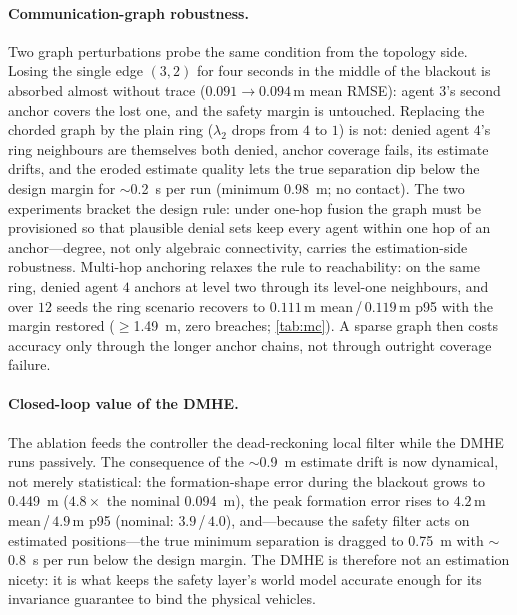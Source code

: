 \paragraph{Communication-graph robustness.}
\label{sec:sim-mc-graph}
Two graph perturbations probe the same condition from the topology side. Losing
the single edge $(3,2)$ for four seconds in the middle of the blackout is
absorbed almost without trace ($0.091\to0.094$\,m mean RMSE): agent $3$'s second
anchor covers the lost one, and the safety margin is untouched. Replacing the
chorded graph by the plain ring ($\lambda_2$ drops from $4$ to $1$) is not:
denied agent $4$'s ring neighbours are themselves both denied, anchor coverage
fails, its estimate drifts, and the eroded estimate quality lets the true
separation dip below the design margin for $\sim$\SI{0.2}{\second} per run
(minimum \SI{0.98}{\meter}; no contact). The two experiments bracket the design
rule: under one-hop fusion the graph must be provisioned so that plausible
denial sets keep every agent within one hop of an anchor---degree, not only
algebraic connectivity, carries the estimation-side robustness. Multi-hop
anchoring relaxes the rule to reachability: on the same ring, denied agent $4$
anchors at level two through its level-one neighbours, and over $12$ seeds the
ring scenario recovers to $0.111$\,m mean\,/\,$0.119$\,m p95 with the margin
restored ($\ge$\SI{1.49}{\meter}, zero breaches; \cref{tab:mc}). A sparse graph
then costs accuracy only through the longer anchor chains, not through outright
coverage failure.

\paragraph{Closed-loop value of the DMHE.} The ablation feeds the controller the
dead-reckoning local filter while the DMHE runs passively. The consequence of
the $\sim$\SI{0.9}{\meter} estimate drift is now dynamical, not merely
statistical: the formation-shape error during the blackout grows to
\SI{0.449}{\meter} ($4.8\times$ the nominal \SI{0.094}{\meter}), the peak
formation error rises to $4.2$\,m mean\,/\,$4.9$\,m p95 (nominal:
$3.9$\,/\,$4.0$), and---because the safety filter acts on estimated
positions---the true minimum separation is dragged to \SI{0.75}{\meter} with
$\sim$\SI{0.8}{\second} per run below the design margin. The DMHE is therefore
not an estimation nicety: it is what keeps the safety layer's world model
accurate enough for its invariance guarantee to bind the physical vehicles.

